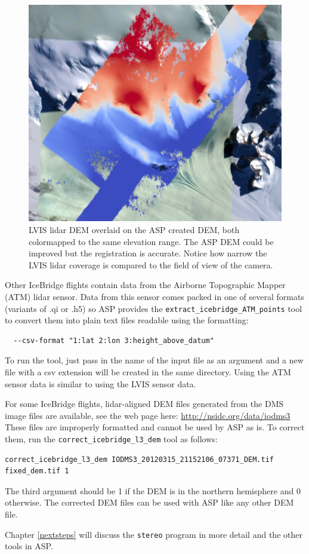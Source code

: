 \begin{figure}[h!]
\centering
  \includegraphics[width=5.5in]{images/examples/pinhole/icebridge_dem_overlay.png}
\caption{LVIS lidar DEM overlaid on the ASP created DEM, both colormapped to the same elevation range.
The ASP DEM could be improved but the registration is accurate.  Notice how narrow the LVIS lidar coverage
is compared to the field of view of the camera.}
\label{fig:pinhole-icebridge-orbitviz}
\end{figure}

Other IceBridge flights contain data from the Airborne Topographic Mapper (ATM) lidar sensor.  
Data from this sensor comes packed in one of several formats (variants of .qi or .h5) so
ASP provides the \texttt{extract\_icebridge\_ATM\_points} tool to convert them into plain
text files readable using the formatting:
\begin{verbatim}  --csv-format "1:lat 2:lon 3:height_above_datum"  \end{verbatim}
To run the tool, just pass in the name of the input file as an argument and a new file with a
csv extension will be created in the same directory.
Using the ATM sensor data is similar to using the LVIS sensor data.

For some IceBridge flights, lidar-aligned DEM files generated from the DMS
image files are available, see the web page here: \url{http://nsidc.org/data/iodms3}
These files are improperly formatted and cannot be used by ASP as is.  To correct them, run
the \texttt{correct\_icebridge\_l3\_dem} tool as follows:
\begin{verbatim}  
correct_icebridge_l3_dem IODMS3_20120315_21152106_07371_DEM.tif  fixed_dem.tif 1  
\end{verbatim}
The third argument should be 1 if the DEM is in the northern hemisphere and 0 otherwise.
The corrected DEM files can be used with ASP like any other DEM file.

Chapter \ref{nextsteps} will discuss the \texttt{stereo} program in more
detail and the other tools in ASP.
